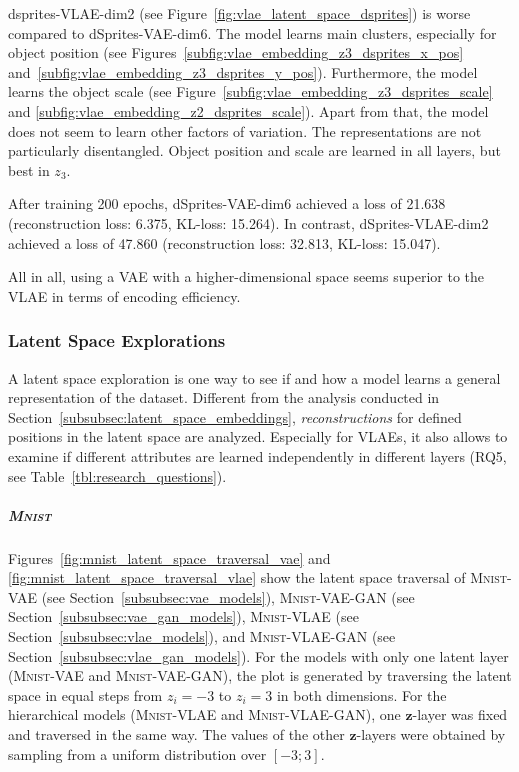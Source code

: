 dsprites-\ac{VLAE}-dim2 (see Figure~\ref{fig:vlae_latent_space_dsprites}) is worse compared to dSprites-\ac{VAE}-dim6.
The model learns main clusters, especially for object position (see Figures~\ref{subfig:vlae_embedding_z3_dsprites_x_pos} and~\ref{subfig:vlae_embedding_z3_dsprites_y_pos}).
Furthermore, the model learns the object scale (see Figure~\ref{subfig:vlae_embedding_z3_dsprites_scale} and \ref{subfig:vlae_embedding_z2_dsprites_scale}).
Apart from that, the model does not seem to learn other factors of variation.
The representations are not particularly disentangled.
Object position and scale are learned in all layers, but best in $z_3$.

After training 200 epochs, dSprites-\ac{VAE}-dim6 achieved a loss of 21.638 (reconstruction loss: 6.375, \ac{KL}-loss: 15.264).
In contrast, dSprites-\ac{VLAE}-dim2 achieved a loss of 47.860 (reconstruction loss: 32.813, \ac{KL}-loss: 15.047).

All in all, using a \ac{VAE} with a higher-dimensional space seems superior to the \ac{VLAE} in terms of encoding efficiency.

\subsubsection{Latent Space Explorations}\label{subsubsec:latent_space_traversals}
A latent space exploration is one way to see if and how a model learns a general representation of the dataset.
Different from the analysis conducted in Section~\ref{subsubsec:latent_space_embeddings}, \textit{reconstructions} for defined positions in the latent space are analyzed.
Especially for \acp{VLAE}, it also allows to examine if different attributes are learned independently in different layers (RQ5, see Table~\ref{tbl:research_questions}).

\subparagraph{\textsc{Mnist}}

Figures~\ref{fig:mnist_latent_space_traversal_vae} and \ref{fig:mnist_latent_space_traversal_vlae} show the latent space traversal of \textsc{Mnist}-\ac{VAE} (see Section~\ref{subsubsec:vae_models}), \textsc{Mnist}-\ac{VAE}-\ac{GAN} (see Section~\ref{subsubsec:vae_gan_models}), \textsc{Mnist}-\ac{VLAE} (see Section~\ref{subsubsec:vlae_models}), and \textsc{Mnist}-\ac{VLAE}-\ac{GAN} (see Section~\ref{subsubsec:vlae_gan_models}).
For the models with only one latent layer (\textsc{Mnist}-\ac{VAE} and \textsc{Mnist}-\ac{VAE}-\ac{GAN}), the plot is generated by traversing the latent space in equal steps from $z_i = -3$ to $z_i = 3$ in both dimensions.
For the hierarchical models (\textsc{Mnist}-\ac{VLAE} and \textsc{Mnist}-\ac{VLAE}-\ac{GAN}), one $\bm{z}$-layer was fixed and traversed in the same way.
The values of the other $\bm{z}$-layers were obtained by sampling from a uniform distribution over $[-3; 3]$.

